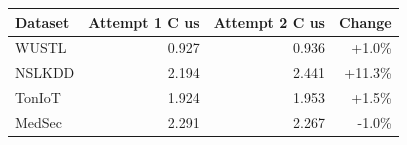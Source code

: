 \begin{tabular}{lrrr}
\toprule
Dataset & Attempt 1 C us & Attempt 2 C us & Change \\
\midrule
WUSTL & 0.927 & 0.936 & +1.0\% \\
NSLKDD & 2.194 & 2.441 & +11.3\% \\
TonIoT & 1.924 & 1.953 & +1.5\% \\
MedSec & 2.291 & 2.267 & -1.0\% \\
\bottomrule
\end{tabular}
